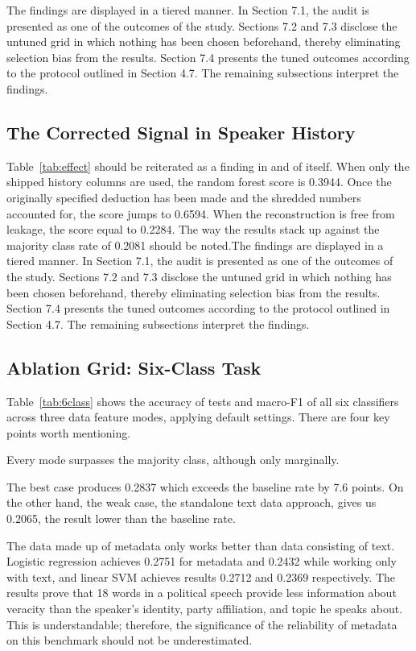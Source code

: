 The findings are displayed in a tiered manner. In Section 7.1, the audit is presented as one of the outcomes of the study. Sections 7.2 and 7.3 disclose the untuned grid in which nothing has been chosen beforehand, thereby eliminating selection bias from the results. Section 7.4 presents the tuned outcomes according to the protocol outlined in Section 4.7. The remaining subsections interpret the findings.

\subsection{The Corrected Signal in Speaker History}

Table~\ref{tab:effect} should be reiterated as a finding in and of itself. When only the shipped history columns are used, the random forest score is 0.3944. Once the originally specified deduction has been made and the shredded numbers accounted for, the score jumps to 0.6594. When the reconstruction is free from leakage, the score equal to 0.2284. The way the results stack up against the majority class rate of 0.2081 should be noted.The findings are displayed in a tiered manner. In Section 7.1, the audit is presented as one of the outcomes of the study. Sections 7.2 and 7.3 disclose the untuned grid in which nothing has been chosen beforehand, thereby eliminating selection bias from the results. Section 7.4 presents the tuned outcomes according to the protocol outlined in Section 4.7. The remaining subsections interpret the findings.

\subsection{Ablation Grid: Six-Class Task}

Table~\ref{tab:6class} shows the accuracy of tests and macro-F1 of all six classifiers across three data feature modes, applying default settings. There are four key points worth mentioning.



Every mode surpasses the majority class, although only marginally.

The best case produces 0.2837 which exceeds the baseline rate by 7.6 points. On the other hand, the weak case, the standalone text data approach, gives us 0.2065, the result lower than the baseline rate.

The data made up of metadata only works better than data consisting of text. Logistic regression achieves 0.2751 for metadata and 0.2432 while working only with text, and linear SVM achieves results 0.2712 and 0.2369 respectively. The results prove that 18 words in a political speech provide less information about veracity than the speaker's identity, party affiliation, and topic he speaks about. This is understandable; therefore, the significance of the reliability of metadata on this benchmark should not be underestimated.

